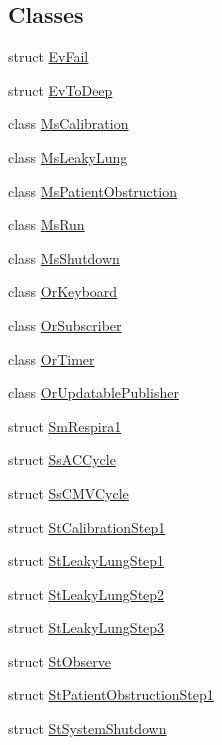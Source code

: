 \subsection*{Classes}
\begin{DoxyCompactItemize}
\item 
struct \hyperlink{structsm__respira__1_1_1EvFail}{Ev\+Fail}
\item 
struct \hyperlink{structsm__respira__1_1_1EvToDeep}{Ev\+To\+Deep}
\item 
class \hyperlink{classsm__respira__1_1_1MsCalibration}{Ms\+Calibration}
\item 
class \hyperlink{classsm__respira__1_1_1MsLeakyLung}{Ms\+Leaky\+Lung}
\item 
class \hyperlink{classsm__respira__1_1_1MsPatientObstruction}{Ms\+Patient\+Obstruction}
\item 
class \hyperlink{classsm__respira__1_1_1MsRun}{Ms\+Run}
\item 
class \hyperlink{classsm__respira__1_1_1MsShutdown}{Ms\+Shutdown}
\item 
class \hyperlink{classsm__respira__1_1_1OrKeyboard}{Or\+Keyboard}
\item 
class \hyperlink{classsm__respira__1_1_1OrSubscriber}{Or\+Subscriber}
\item 
class \hyperlink{classsm__respira__1_1_1OrTimer}{Or\+Timer}
\item 
class \hyperlink{classsm__respira__1_1_1OrUpdatablePublisher}{Or\+Updatable\+Publisher}
\item 
struct \hyperlink{structsm__respira__1_1_1SmRespira1}{Sm\+Respira1}
\item 
struct \hyperlink{structsm__respira__1_1_1SsACCycle}{Ss\+A\+C\+Cycle}
\item 
struct \hyperlink{structsm__respira__1_1_1SsCMVCycle}{Ss\+C\+M\+V\+Cycle}
\item 
struct \hyperlink{structsm__respira__1_1_1StCalibrationStep1}{St\+Calibration\+Step1}
\item 
struct \hyperlink{structsm__respira__1_1_1StLeakyLungStep1}{St\+Leaky\+Lung\+Step1}
\item 
struct \hyperlink{structsm__respira__1_1_1StLeakyLungStep2}{St\+Leaky\+Lung\+Step2}
\item 
struct \hyperlink{structsm__respira__1_1_1StLeakyLungStep3}{St\+Leaky\+Lung\+Step3}
\item 
struct \hyperlink{structsm__respira__1_1_1StObserve}{St\+Observe}
\item 
struct \hyperlink{structsm__respira__1_1_1StPatientObstructionStep1}{St\+Patient\+Obstruction\+Step1}
\item 
struct \hyperlink{structsm__respira__1_1_1StSystemShutdown}{St\+System\+Shutdown}
\end{DoxyCompactItemize}

